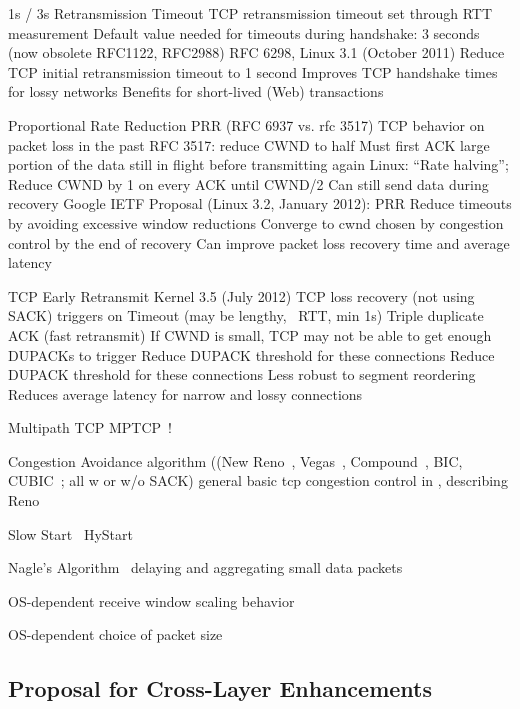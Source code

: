 1s / 3s Retransmission Timeout \cite{rfc6298}
 TCP retransmission timeout set through RTT measurement
 Default value needed for timeouts during handshake: 3 seconds (now obsolete RFC1122, RFC2988)
 RFC 6298, Linux 3.1 (October 2011)
	Reduce TCP initial retransmission timeout to 1 second
 Improves TCP handshake times for lossy networks
 Benefits for short-lived (Web) transactions


Proportional Rate Reduction PRR (RFC 6937 \cite{rfc6937} vs. rfc 3517)
 TCP behavior on packet loss in the past
	RFC 3517: reduce CWND to half
		Must first ACK large portion of the data still in flight before transmitting again
	Linux: ``Rate halving''; Reduce CWND by 1 on every ACK until CWND/2
		Can still send data during recovery
 Google IETF Proposal (Linux 3.2, January 2012): PRR
	Reduce timeouts by avoiding excessive window reductions
	Converge to cwnd chosen by congestion control by the end of recovery
	Can improve packet loss recovery time and average latency



TCP Early Retransmit \cite{rfc5827} Kernel 3.5 (July 2012)
 TCP loss recovery (not using SACK) triggers on
	Timeout (may be lengthy, ~RTT, min 1s)
	Triple duplicate ACK (fast retransmit)
		If CWND is small, TCP may not be able to get enough DUPACKs to trigger
		Reduce DUPACK threshold for these connections
 Reduce DUPACK threshold for these connections
	Less robust to segment reordering
 Reduces average latency for narrow and lossy connections

Multipath TCP MPTCP~\cite{rfc6824}!


Congestion Avoidance algorithm ((New Reno~\cite{rfc6582}, Vegas~\cite{Brakmo:1994:TVN:190809.190317}, Compound~\cite{song2006compound}, BIC, CUBIC~\cite{ha2008cubic}; all w or w/o SACK)
general basic tcp congestion control in \cite{rfc5681}, describing Reno

Slow Start~\cite{rfc5681}
 HyStart~\cite{Ha20112092}


Nagle's Algorithm~\cite{rfc896} delaying and aggregating small data packets


OS-dependent receive window scaling behavior

OS-dependent choice of packet size


\subsection{Proposal for Cross-Layer Enhancements}
\label{c5:crosslayerhinting}


